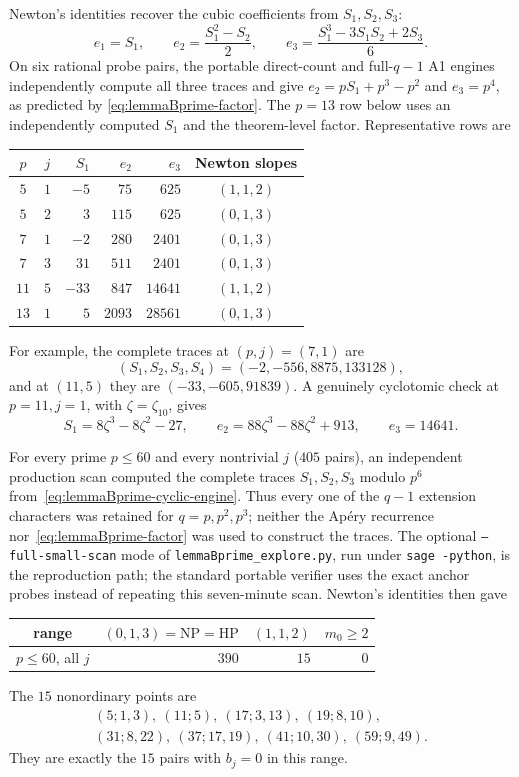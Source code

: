 Newton's identities recover the cubic coefficients from $S_1,S_2,S_3$:
\[
 e_1=S_1,\qquad e_2=\frac{S_1^2-S_2}{2},\qquad
 e_3=\frac{S_1^3-3S_1S_2+2S_3}{6}.
\]
On six rational probe pairs, the portable direct-count and full-$q-1$ A1
engines independently compute all three traces and give
$e_2=pS_1+p^3-p^2$ and $e_3=p^4$, as predicted by
\eqref{eq:lemmaBprime-factor}.  The $p=13$ row below uses an independently
computed $S_1$ and the theorem-level factor.  Representative rows are
\begin{center}
\begin{tabular}{c|c|r|r|r|c}
 $p$ & $j$ & $S_1$ & $e_2$ & $e_3$ & Newton slopes \\ \hline
 $5$  & $1$ & $-5$  & $75$  & $625$   & $(1,1,2)$ \\
 $5$  & $2$ & $3$   & $115$ & $625$   & $(0,1,3)$ \\
 $7$  & $1$ & $-2$  & $280$ & $2401$  & $(0,1,3)$ \\
 $7$  & $3$ & $31$  & $511$ & $2401$  & $(0,1,3)$ \\
 $11$ & $5$ & $-33$ & $847$ & $14641$ & $(1,1,2)$ \\
 $13$ & $1$ & $5$   & $2093$& $28561$ & $(0,1,3)$
\end{tabular}
\end{center}
For example, the complete traces at $(p,j)=(7,1)$ are
\[
 (S_1,S_2,S_3,S_4)=(-2,-556,8875,133128),
\]
and at $(11,5)$ they are $(-33,-605,91839)$.  A genuinely cyclotomic
check at $p=11,j=1$, with $\zeta=\zeta_{10}$, gives
\[
 S_1=8\zeta^3-8\zeta^2-27,\qquad
 e_2=88\zeta^3-88\zeta^2+913,\qquad e_3=14641.
\]

For every prime $p\leq60$ and every nontrivial $j$ ($405$ pairs), an
independent production scan computed the complete traces $S_1,S_2,S_3$
modulo $p^6$ from~\eqref{eq:lemmaBprime-cyclic-engine}.  Thus every one of
the $q-1$ extension characters was retained for $q=p,p^2,p^3$; neither the
Ap\'ery recurrence nor~\eqref{eq:lemmaBprime-factor} was used to construct
the traces.  The optional \texttt{--full-small-scan} mode of
\texttt{lemmaBprime\_explore.py}, run under \texttt{sage -python}, is the
reproduction path; the standard portable verifier uses the exact anchor
probes instead of repeating this seven-minute scan.  Newton's identities
then gave
\begin{center}
\begin{tabular}{c|r|r|r}
 range & $(0,1,3)=\mathrm{NP}=\mathrm{HP}$ & $(1,1,2)$ & $m_0\geq2$ \\ \hline
 $p\leq60$, all $j$ & $390$ & $15$ & $0$
\end{tabular}
\end{center}
The $15$ nonordinary points are
\[
\begin{gathered}
 (5;1,3),\ (11;5),\ (17;3,13),\ (19;8,10),\\
 (31;8,22),\ (37;17,19),\ (41;10,30),\ (59;9,49).
\end{gathered}
\]
They are exactly the $15$ pairs with $b_j=0$ in this range.

